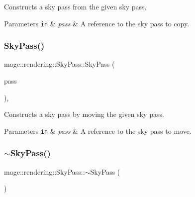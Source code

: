 Constructs a sky pass from the given sky pass.


\begin{DoxyParams}[1]{Parameters}
\mbox{\tt in}  & {\em pass} & A reference to the sky pass to copy. \\
\hline
\end{DoxyParams}
\mbox{\label{classmage_1_1rendering_1_1_sky_pass_a2d9489936058c463743bd437fb0cbb3e}} 
\subsubsection{\texorpdfstring{Sky\+Pass()}{SkyPass()}\hspace{0.1cm}{\footnotesize\ttfamily [3/3]}}
{\footnotesize\ttfamily mage\+::rendering\+::\+Sky\+Pass\+::\+Sky\+Pass (\begin{DoxyParamCaption}\item[{\mbox{\hyperlink{classmage_1_1rendering_1_1_sky_pass}{Sky\+Pass}} \&\&}]{pass }\end{DoxyParamCaption})\hspace{0.3cm}{\ttfamily [default]}, {\ttfamily [noexcept]}}

Constructs a sky pass by moving the given sky pass.


\begin{DoxyParams}[1]{Parameters}
\mbox{\tt in}  & {\em pass} & A reference to the sky pass to move. \\
\hline
\end{DoxyParams}
\mbox{\label{classmage_1_1rendering_1_1_sky_pass_a99473ca11c0c25ab0608a3f93cf30aa6}} 
\subsubsection{\texorpdfstring{$\sim$\+Sky\+Pass()}{~SkyPass()}}
{\footnotesize\ttfamily mage\+::rendering\+::\+Sky\+Pass\+::$\sim$\+Sky\+Pass (\begin{DoxyParamCaption}{ }\end{DoxyParamCaption})\hspace{0.3cm}{\ttfamily [default]}}

